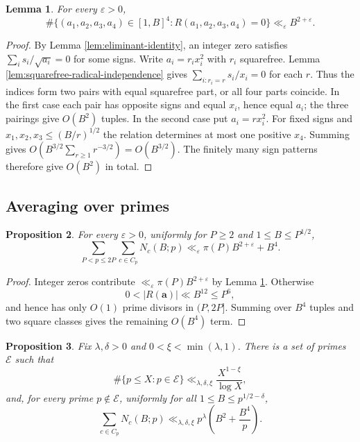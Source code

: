 \documentclass[12pt, a4paper]{amsart}
\numberwithin{equation}{section}
\newcommand{\ep}{\varepsilon}
\renewcommand{\le}{\leqslant}
\renewcommand{\ge}{\geqslant}
\theoremstyle{plain}
\newtheorem{lem}{Lemma}[section]
\newtheorem{prop}[lem]{Proposition}
\begin{document}
\begin{lem}\label{lem:integer-zero-count}
For every $\ep>0$,
$$
\#\{(a_1,a_2,a_3,a_4)\in[1,B]^4:
R(a_1,a_2,a_3,a_4)=0\}
\ll_\ep B^{2+\ep}.
$$
\end{lem}

\begin{proof}
By Lemma \ref{lem:eliminant-identity}, an integer zero satisfies $\sum_is_i/\sqrt{a_i}=0$ for some signs. Write $a_i=r_ix_i^2$ with $r_i$ squarefree. Lemma \ref{lem:squarefree-radical-independence} gives $\sum_{i:r_i=r}s_i/x_i=0$ for each $r$. Thus the indices form two pairs with equal squarefree part, or all four parts coincide. In the first case each pair has opposite signs and equal $x_i$, hence equal $a_i$; the three pairings give $O(B^2)$ tuples. In the second case put $a_i=rx_i^2$. For fixed signs and $x_1,x_2,x_3\le(B/r)^{1/2}$ the relation determines at most one positive $x_4$. Summing gives $O(B^{3/2}\sum_{r\ge1}r^{-3/2})=O(B^{3/2})$. The finitely many sign patterns therefore give $O(B^2)$ in total.
\end{proof}

\subsection{Averaging over primes}

\begin{prop}\label{prop:prime-average}
For every $\ep>0$, uniformly for $P\ge2$ and $1\le B\le P^{1/2}$,
$$
\sum_{P<p\le2P}\sum_{c\in C_p}N_c(B;p)
\ll_\ep \pi(P)B^{2+\ep}+B^4.
$$
\end{prop}

\begin{proof}
Integer zeros contribute $\ll_\ep \pi(P)B^{2+\ep}$ by Lemma \ref{lem:integer-zero-count}. Otherwise
$$
0<|R(\mathbf a)|\ll B^{12}\le P^6,
$$
and hence has only $O(1)$ prime divisors in $(P,2P]$. Summing over $B^4$ tuples and two square classes gives the remaining $O(B^4)$ term.
\end{proof}

\begin{prop}\label{prop:almost-all-N}
Fix $\lambda,\delta>0$ and $0<\xi<\min(\lambda,1)$. There is a set of primes $\mathcal E$ such that
$$
\#\{p\le X:p\in\mathcal E\}
\ll_{\lambda,\delta,\xi}\frac{X^{1-\xi}}{\log X},
$$
and, for every prime $p\notin\mathcal E$, uniformly for all $1\le B\le p^{1/2-\delta}$,
$$
\sum_{c\in C_p}N_c(B;p)
\ll_{\lambda,\delta,\xi} p^\lambda\left(B^2+\frac{B^4}{p}\right).
$$
\end{prop}
\end{document}
